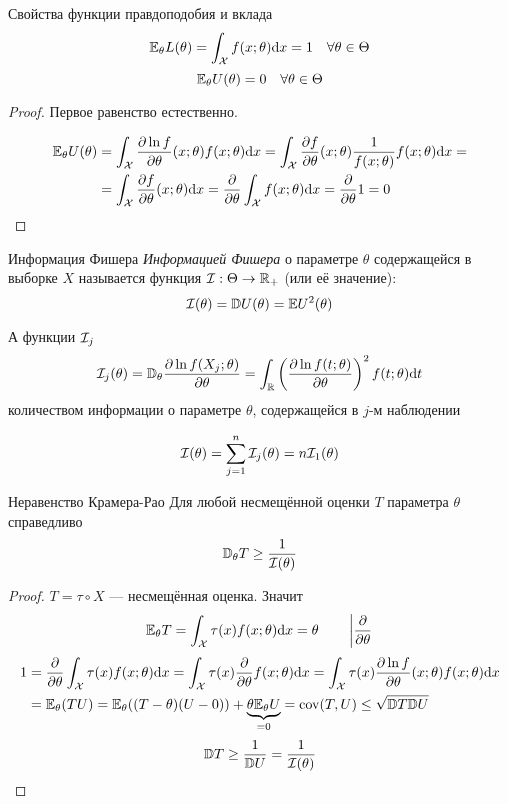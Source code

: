 \begin{thm}{Свойства функции правдоподобия и вклада}
$$\mathbb E_\theta L(\theta) = \int_\mathcal X f(x;\theta) \mathrm d x = 1 \quad\forall\theta\in\Theta$$
$$\mathbb E_\theta U(\theta) = 0 \quad\forall\theta\in\Theta$$
\end{thm}
\begin{proof}
Первое равенство естественно.

$$\begin{aligned}
\mathbb E_\theta U(\theta)
&= \int_\mathcal X \frac{\partial\ln f}{\partial\theta}(x;\theta) f(x;\theta)\mathrm d x
 = \int_\mathcal X \frac{\partial f}{\partial\theta}(x;\theta) \frac1{f(x;\theta)} f(x;\theta)\mathrm d x=\\
&= \int_\mathcal X \frac{\partial f}{\partial\theta}(x;\theta)\mathrm d x
 = \frac{\partial}{\partial\theta} \int_\mathcal X f(x;\theta)\mathrm d x
 = \frac{\partial}{\partial\theta} 1
 = 0
\end{aligned}$$
\end{proof}

\begin{dfn}{Информация Фишера}
\emph{Информацией Фишера}
о параметре $\theta$
содержащейся в выборке $X$
называется функция $\mathcal I:\Theta\to\mathbb R_+$ (или её значение):
$$\mathcal I(\theta) = \mathbb D U(\theta) = \mathbb E U^2(\theta)$$

А функции $\mathcal I_j$
$$\mathcal I_j(\theta)
= \mathbb D_\theta \frac{\partial\ln f(X_j;\theta)}{\partial\theta}
= \int_\mathbb R \left(\frac{\partial\ln f(t;\theta)}{\partial\theta}\right)^2 f(t;\theta) \mathrm d t $$
количеством информации о параметре $\theta$,
содержащейся в $j$-м наблюдении

$$\mathcal I(\theta) = \sum_{j=1}^n \mathcal I_j(\theta) = n\mathcal I_1(\theta)$$
\end{dfn}

\begin{thm}{Неравенство Крамера-Рао}
Для любой несмещённой оценки $T$ параметра $\theta$ справедливо
$$\mathbb D_\theta T \geq \frac{1}{\mathcal I(\theta)}$$
\end{thm}
\begin{proof}
$T=\tau\circ X$ --- несмещённая оценка. Значит
$$\mathbb E_\theta T = \int_\mathcal X \tau(x)f(x;\theta) \mathrm d x = \theta
\qquad \left|\frac\partial{\partial\theta}\right.$$
$$\begin{aligned}
1
&=\frac\partial{\partial\theta}\int_\mathcal X \tau(x)f(x;\theta)\mathrm d x
 = \int_\mathcal X \tau(x) \frac\partial{\partial\theta} f(x;\theta)\mathrm d x
 = \int_\mathcal X \tau(x) \frac{\partial\ln f}{\partial\theta}(x;\theta)f(x;\theta)\mathrm d x \\
&= \mathbb E_\theta(T U) = \mathbb E_\theta((T - \theta)(U-0)) + \underbrace{\theta\mathbb E_\theta U}_{=0}
 = \mathrm{cov}(T,U)
 \leq \sqrt{\mathbb D T \mathbb D U}
\end{aligned}$$
$$\mathbb D T \geq \frac{1}{\mathbb D U} = \frac{1}{\mathcal I(\theta)}$$
\end{proof}

